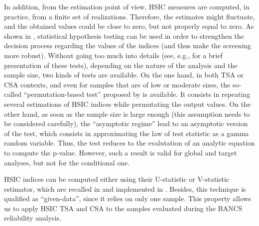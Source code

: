 In addition, from the estimation point of view, HSIC measures are computed, in practice, from a finite set of realizations. 
Therefore, the estimates might fluctuate, and the obtained values could be close to zero, but not properly equal to zero. 
As shown in \citet{delozzo_2016_hsic_test}, statistical hypothesis testing can be used in order to strengthen the decision process regarding the values of the indices (and thus make the screening more robust). 
Without going too much into details (see, e.g., \citealp{chabridon_iooss_marrel_2020} for a brief presentation of these tests), depending on the nature of the analysis and the sample size, two kinds of tests are available. 
On the one hand, in both TSA or CSA contexts, and even for samples that are of low or moderate sizes, the so-called ``permutation-based test'' proposed by \citet{delozzo_2016_hsic_test} is available. 
It consists in repeating several estimations of HSIC indices while permutating the output values. 
On the other hand, as soon as the sample size is large enough (this assumption needs to be considered carefully), the ``asymptotic regime'' lead to an asymptotic version of the test, which consists in approximating the law of test statistic as a gamma random variable. 
Thus, the test reduces to the evalutation of an analytic equation to compute the p-value. 
However, such a result is valid for global and target analyses, but not for the conditional one.

HSIC indices can be computed either using their U-statistic or V-statistic estimator, which are recalled in \citet{marrel_chabridon_2021} and implemented in \ot.
Besides, this technique is qualified as ``given-data'', since it relies on only one sample. 
This property allows us to apply HSIC TSA and CSA to the samples evaluated during the BANCS reliability analysis.


